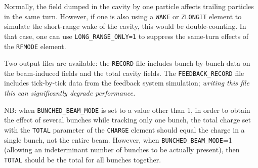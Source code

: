 Normally, the field dumped in the cavity by one particle affects trailing particles in the same turn.
However, if one is also using a \verb|WAKE| or \verb|ZLONGIT| element to simulate the short-range wake of the cavity, this would be double-counting.
In that case, one can use \verb|LONG_RANGE_ONLY=1| to suppress the same-turn effects of the \verb|RFMODE| element.

Two output files are available: the \verb|RECORD| file includes bunch-by-bunch data on the beam-induced fields and the total cavity fields.
The \verb|FEEDBACK_RECORD| file includes tick-by-tick data from the feedback system simulation; {\em writing this file this can significantly degrade performance.}

NB: when \verb|BUNCHED_BEAM_MODE| is set to a value other than 1, in order to obtain the effect of several bunches while tracking
only one bunch, the total charge set with the \verb|TOTAL| parameter of the \verb|CHARGE| element should equal the charge in
a single bunch, not the entire beam. However, when \verb|BUNCHED_BEAM_MODE|=1 (allowing an indeterminant number of bunches to be
actually present), then \verb|TOTAL| should be the total for all bunches together.
